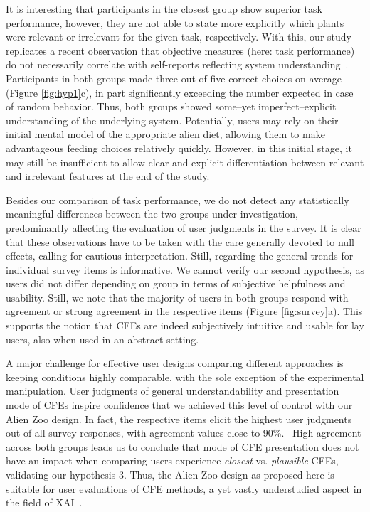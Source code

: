 It is interesting that participants in the closest group show superior task performance, however, they are not able to state more explicitly which plants were relevant or irrelevant for the given task, respectively. 
With this, our study replicates a recent observation that objective measures (here: task performance) do not necessarily correlate with self-reports reflecting system understanding~\citep{van_der_waa_evaluating_2021}.
Participants in both groups made three out of five correct choices on average (Figure \ref{fig:hyp1}c), in part significantly exceeding the number expected in case of random behavior.
Thus, both groups showed some--yet imperfect--explicit understanding of the underlying system.
Potentially, users may rely on their initial mental model of the appropriate alien diet, allowing them to make advantageous feeding choices relatively quickly. However, in this initial stage, it may still be insufficient to allow clear and explicit differentiation between relevant and irrelevant features at the end of the study.

Besides our comparison of task performance, we do not detect any statistically meaningful differences between the two groups under investigation, predominantly affecting the evaluation of user judgments in the survey. 
It is clear that these observations have to be taken with the care generally devoted to null effects, calling for cautious interpretation. 
Still, regarding the general trends for individual survey items is informative.
We cannot verify our second hypothesis, as users did not differ depending on group in terms of subjective helpfulness and usability. 
Still, we note that the majority of users in both groups respond with agreement or strong agreement in the respective items (Figure \ref{fig:survey}a).
This supports the notion that \glspl{CFE} are indeed subjectively intuitive and usable for lay users, also when used in an abstract setting.

A major challenge for effective user designs comparing different approaches is keeping conditions highly comparable, with the sole exception of the experimental manipulation.
User judgments of general understandability and presentation mode of \glspl{CFE} inspire confidence that we achieved this level of control with our Alien Zoo design. 
In fact, the respective items elicit the highest user judgments out of all survey responses, with agreement values close to 90\%.%
~High agreement across both groups leads us to conclude that mode of \gls{CFE} presentation does not have an impact when comparing users experience \textit{closest} vs. \textit{plausible} \glspl{CFE}, validating our hypothesis 3.
Thus, the Alien Zoo design as proposed here is suitable for user evaluations of \gls{CFE} methods, a yet vastly understudied aspect in the field of \gls{XAI}~\citep{keane_if_2021}.

